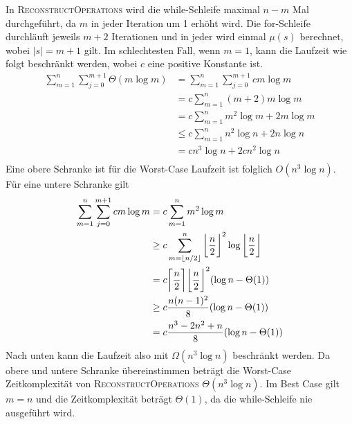 \documentclass[a4paper, 11pt, ngerman]{article}
\begin{document}
In \textsc{ReconstructOperations} wird die while-Schleife maximal $n - m$ Mal durchgeführt, da $m$ in jeder Iteration um 1 erhöht wird. Die for-Schleife durchläuft jeweils $m + 2$ Iterationen und in jeder wird einmal $\mu(s)$ berechnet, wobei $|s| = m+1$ gilt. Im schlechtesten Fall, wenn $m = 1$, kann die Laufzeit wie folgt beschränkt werden, wobei $c$ eine positive Konstante ist.
\begin{align*}
    \sum_{m = 1}^n \sum_{j = 0}^{m+1} \Theta(m \log m)
     & = \sum_{m = 1}^n \sum_{j = 0}^{m+1} cm \log m \\
     & = c \sum_{m = 1}^n (m + 2)m \log m            \\
     & = c \sum_{m = 1}^n m^2 \log m + 2 m \log m    \\
     & \le c \sum_{m = 1}^n n^2 \log n  + 2 n \log n \\
     & = cn^3 \log n + 2cn^2 \log n                  \\
\end{align*}
Eine obere Schranke ist für die Worst-Case Laufzeit ist folglich $O(n^3 \log n)$. Für eine untere Schranke gilt
\begin{align*}
    \sum_{m = 1}^n \sum_{j = 0}^{m+1} cm \log m
     & = c \sum_{m = 1}^n m^2 \log m                                                                                                          \\
     & \ge c \sum_{m = \lfloor n / 2 \rfloor}^{n} \bigg{\lfloor} \frac {n} {2} \bigg{\rfloor} ^2 \log \bigg{\lfloor} \frac n 2 \bigg{\rfloor} \\
     & = c \bigg{\lceil} \frac n 2 \bigg{\rceil} \bigg{\lfloor} \frac n 2 \bigg{\rfloor} ^2 (\log n - \Theta (1))                             \\
     & \ge c \frac {n(n - 1)^2}  8 (\log n - \Theta (1))                                                                                      \\
     & = c \frac {n^3 - 2n^2 + n} 8 (\log n - \Theta (1))
\end{align*}
Nach unten kann die Laufzeit also mit $\Omega(n^3 \log n)$ beschränkt werden. Da obere und untere Schranke übereinstimmen beträgt die Worst-Case Zeitkomplexität von \textsc{ReconstructOperations} $\Theta(n^3 \log n)$. Im Best Case gilt $m = n$ und die Zeitkomplexität beträgt $\Theta(1)$, da die while-Schleife nie ausgeführt wird.
\bigskip
\end{document}

